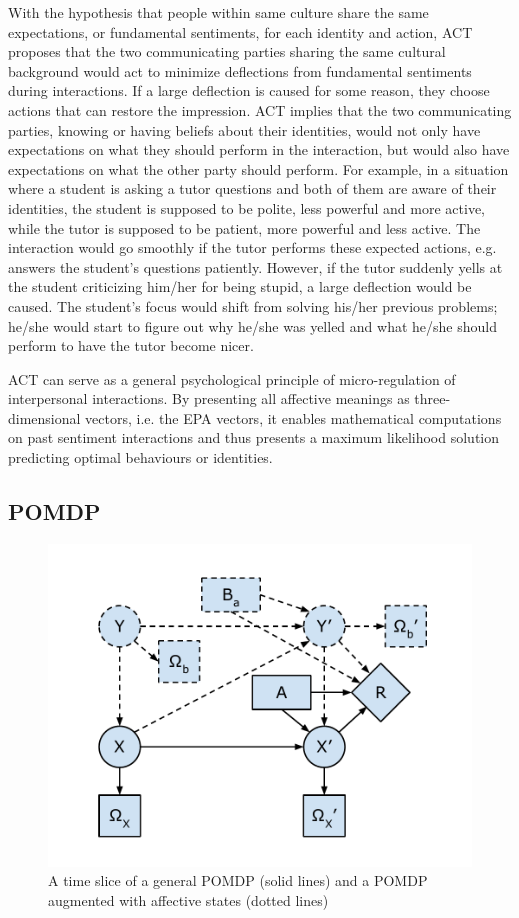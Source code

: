 With the hypothesis that people within same culture share the same expectations, or fundamental sentiments, for each identity and action, ACT proposes that the two communicating parties sharing the same cultural background would act to minimize deflections from fundamental sentiments during interactions. If a large deflection is caused for some reason, they choose actions that can restore the impression. ACT implies that the two communicating parties, knowing or having beliefs about their identities, would not only have expectations on what they should perform in the interaction, but would also have expectations on what the other party should perform. For example, in a situation where a student is asking a tutor questions and both of them are aware of their identities, the student is supposed to be polite, less powerful and more active, while the tutor is supposed to be patient, more powerful and less active. The interaction would go smoothly if the tutor performs these expected actions, e.g. answers the student's questions patiently. However, if the tutor suddenly yells at the student criticizing him/her for being stupid, a large deflection would be caused. The student's focus would shift from solving his/her previous problems; he/she would start to figure out why he/she was yelled and what he/she should perform to have the tutor become nicer.

ACT can serve as a general psychological principle of micro-regulation of interpersonal interactions. By presenting all affective meanings as three-dimensional vectors, i.e. the EPA vectors, it enables mathematical computations on past sentiment interactions and thus presents a maximum likelihood solution predicting optimal behaviours or identities. 

\subsection{POMDP}


\begin{figure}[htb]
\centering
\includegraphics[trim = 10mm 10mm 10mm 10mm, clip, width=0.6\linewidth]{fig/fig-pomdp.pdf}
\caption{A time slice of a general POMDP (solid lines) and a POMDP augmented with affective states (dotted lines)}
\label{fig:pomdp}
\end{figure}

